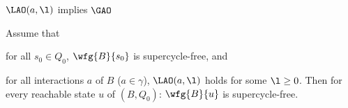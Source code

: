 \bl \label{lemma:loc.ANDOR.implies.glob.AND-OR}
$\LAO(a, \l)$ implies $\GAO$
\el



\label{theorem:local.ANDOR.deadlock-free}
Assume that 
\bn
\item for all $s_0 \in Q_0$, $\wfg{B}{s_0}$ is supercycle-free, and
\item for all interactions $a$ of $B$ ($a \in \gamma$), $\LAO(a,\l)$ holds for some $\l \ge 0$.
\en
Then for every reachable state $u$ of $(B, Q_0)$:  $\wfg{B}{u}$ is supercycle-free.
\et
%

